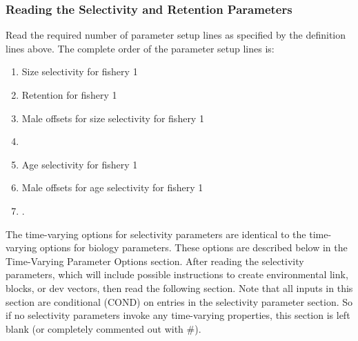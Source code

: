 \subsubsection{Reading the Selectivity and Retention Parameters}
Read the required number of parameter setup lines as specified by the definition lines above.  The complete order of the parameter setup lines is:
\begin{enumerate}
	\item Size selectivity for fishery 1
	\item Retention for fishery 1
	\item Male offsets for size selectivity for fishery 1
	\item <repeat for additional fleets and surveys>
	\item Age selectivity for fishery 1
	\item Male offsets for age selectivity for fishery 1
	\item <repeat for additional fleets and surveys>.
\end{enumerate}

The time-varying options for selectivity parameters are identical to the time-varying options for biology parameters.  These options are described below in the Time-Varying Parameter Options section.  After reading the selectivity parameters, which will include possible instructions to create environmental link, blocks, or dev vectors, then read the following section.  Note that all inputs in this section are conditional (COND) on entries in the selectivity parameter section.  So if no selectivity parameters invoke any time-varying properties, this section is left blank (or completely commented out with \#).

